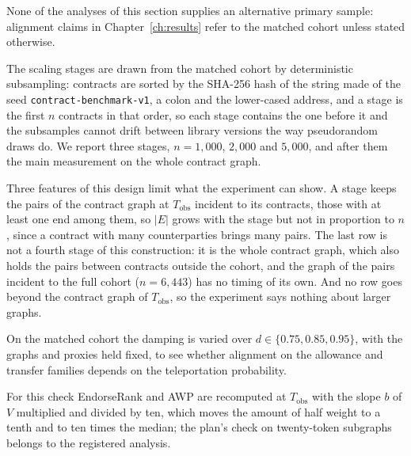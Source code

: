 
None of the analyses of this section supplies an alternative primary sample: alignment claims in Chapter~\ref{ch:results} refer to the matched cohort unless stated otherwise.


The scaling stages are drawn from the matched cohort by deterministic subsampling: contracts are sorted by the SHA-256 hash of the string made of the seed \texttt{contract-benchmark-v1}, a colon and the lower-cased address, and a stage is the first $n$ contracts in that order, so each stage contains the one before it and the subsamples cannot drift between library versions the way pseudorandom draws do. We report three stages, $n=1{,}000$, $2{,}000$ and $5{,}000$, and after them the main measurement on the whole contract graph.

Three features of this design limit what the experiment can show. A stage keeps the pairs of the contract graph at $T_{\mathrm{obs}}$ incident to its contracts, those with at least one end among them, so $|E|$ grows with the stage but not in proportion to $n$, since a contract with many counterparties brings many pairs. The last row is not a fourth stage of this construction: it is the whole contract graph, which also holds the pairs between contracts outside the cohort, and the graph of the pairs incident to the full cohort ($n=6{,}443$) has no timing of its own. And no row goes beyond the contract graph of $T_{\mathrm{obs}}$, so the experiment says nothing about larger graphs.


On the matched cohort the damping is varied over $d\in\{0.75,0.85,0.95\}$, with the graphs and proxies held fixed, to see whether alignment on the allowance and transfer families depends on the teleportation probability.


For this check EndorseRank and AWP are recomputed at $T_{\mathrm{obs}}$ with the slope $b$ of $V$ multiplied and divided by ten, which moves the amount of half weight to a tenth and to ten times the median; the plan's check on twenty-token subgraphs belongs to the registered analysis.


